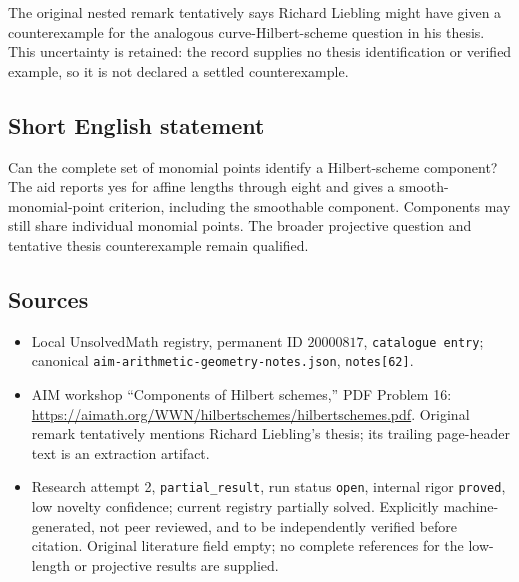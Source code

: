 \documentclass[11pt]{article}
\begin{document}
The original nested remark tentatively says Richard Liebling might have given a counterexample for the analogous curve-Hilbert-scheme question in his thesis. This uncertainty is retained: the record supplies no thesis identification or verified example, so it is not declared a settled counterexample.
\subsection{Short English statement}
Can the complete set of monomial points identify a Hilbert-scheme component? The aid reports yes for affine lengths through eight and gives a smooth-monomial-point criterion, including the smoothable component. Components may still share individual monomial points. The broader projective question and tentative thesis counterexample remain qualified.
\subsection{Sources}
\begin{itemize}
\item Local UnsolvedMath registry, permanent ID $20000817$, \texttt{catalogue entry}; canonical \texttt{aim-arithmetic-geometry-notes.json}, \texttt{notes[62]}.
\item AIM workshop ``Components of Hilbert schemes,'' PDF Problem 16: \url{https://aimath.org/WWN/hilbertschemes/hilbertschemes.pdf}. Original remark tentatively mentions Richard Liebling's thesis; its trailing page-header text is an extraction artifact.
\item Research attempt 2, \texttt{partial\_result}, run status \texttt{open}, internal rigor \texttt{proved}, low novelty confidence; current registry partially solved. Explicitly machine-generated, not peer reviewed, and to be independently verified before citation. Original literature field empty; no complete references for the low-length or projective results are supplied.
\end{itemize}
\end{document}
